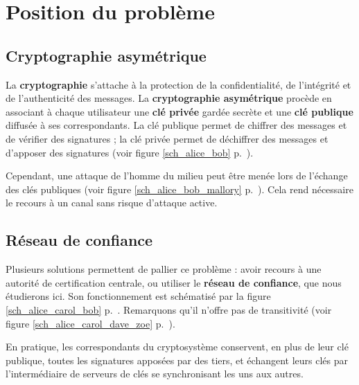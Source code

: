 \documentclass[a4paper]{article}
\title{\vtitle}
\author{Antoine Amarilli}
\date{}
\newcommand{\deft}[1]{\textbf{#1}}
\begin{document}
\maketitle

\tableofcontents

\pagebreak

\section{Position du problème}

\subsection{Cryptographie asymétrique}

La \deft{cryptographie} s'attache à la protection de la confidentialité, de l'intégrité et de l'authenticité des messages. La \deft{cryptographie asymétrique} procède en associant à chaque utilisateur une \deft{clé privée} gardée secrète et une \deft{clé publique} diffusée à ses correspondants. La clé publique permet de chiffrer des messages et de vérifier des signatures ; la clé privée permet de déchiffrer des messages et d'apposer des signatures (voir figure \ref{sch_alice_bob} p.~\pageref{sch_alice_bob}).

Cependant, une attaque de l'homme du milieu peut être menée lors de l'échange des clés publiques (voir figure \ref{sch_alice_bob_mallory} p.~\pageref{sch_alice_bob_mallory}). Cela rend nécessaire le recours à un canal sans risque d'attaque active.

\subsection{Réseau de confiance}

Plusieurs solutions permettent de pallier ce problème : avoir recours à une autorité de certification centrale, ou utiliser le \deft{réseau de confiance}, que nous étudierons ici. Son fonctionnement est schématisé par la figure \ref{sch_alice_carol_bob} p.~\pageref{sch_alice_carol_bob}. Remarquons qu'il n'offre pas de transitivité (voir figure \ref{sch_alice_carol_dave_zoe} p.~\pageref{sch_alice_carol_dave_zoe}).

En pratique, les correspondants du cryptosystème conservent, en plus de leur clé publique, toutes les signatures apposées par des tiers, et échangent leurs clés par l'intermédiaire de serveurs de clés se synchronisant les uns aux autres.
\end{document}
